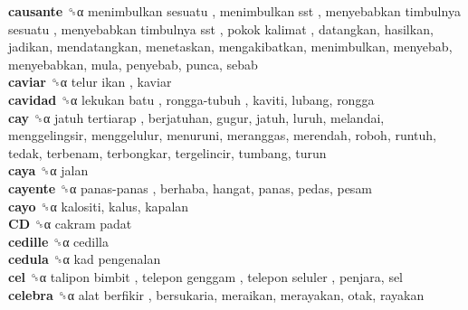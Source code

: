 \textbf{causante} ␝α   menimbulkan sesuatu ,  menimbulkan sst ,  menyebabkan timbulnya sesuatu ,  menyebabkan timbulnya sst ,  pokok kalimat , datangkan, hasilkan, jadikan, mendatangkan, menetaskan, mengakibatkan, menimbulkan, menyebab, menyebabkan, mula, penyebab, punca, sebab  \\
\textbf{caviar} ␝α   telur ikan , kaviar  \\
\textbf{cavidad} ␝α   lekukan batu ,  rongga-tubuh , kaviti, lubang, rongga  \\
\textbf{cay} ␝α   jatuh tertiarap , berjatuhan, gugur, jatuh, luruh, melandai, menggelingsir, menggelulur, menuruni, meranggas, merendah, roboh, runtuh, tedak, terbenam, terbongkar, tergelincir, tumbang, turun  \\
\textbf{caya} ␝α  jalan  \\
\textbf{cayente} ␝α   panas-panas , berhaba, hangat, panas, pedas, pesam  \\
\textbf{cayo} ␝α  kalositi, kalus, kapalan  \\
\textbf{CD} ␝α   cakram padat   \\
\textbf{cedille} ␝α  cedilla  \\
\textbf{cedula} ␝α   kad pengenalan   \\
\textbf{cel} ␝α   talipon bimbit ,  telepon genggam ,  telepon seluler , penjara, sel  \\
\textbf{celebra} ␝α   alat berfikir , bersukaria, meraikan, merayakan, otak, rayakan  \\

